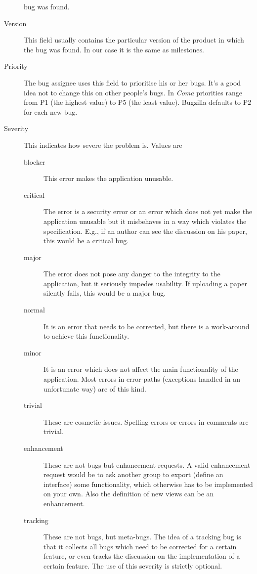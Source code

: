 \documentclass[11pt,nologo,handout]{handout}
\newcommand{\Coma}{\textsl{Coma}}
\begin{document}
\begin{description}
  bug was found.
\item[Version]  This field usually contains the particular version of the
  product in which the bug was found.  In our case it is the same as
  milestones.
\item[Priority]  The bug assignee uses this field to prioritise his or her
  bugs.  It's a good idea not to change this on other people's bugs.  In
  {\Coma} priorities range from P1 (the highest value) to P5 (the least
  value).  Bugzilla defaults to P2 for each new bug.
\item[Severity]  This indicates how severe the problem is.  Values are
  \begin{description}
  \item[blocker]  This error makes the application unusable.
  \item[critical]  The error is a security error or an error which does not
    yet make the application unusable but it misbehaves in a way which
    violates the specification.  E.g., if an author can see the discussion
    on his paper, this would be a critical bug.
  \item[major]  The error does not pose any danger to the integrity to the
    application, but it seriously impedes usability.  If uploading a paper
    silently fails, this would be a major bug.
  \item[normal]  It is an error that needs to be corrected, but there is
    a work-around to achieve this functionality.
  \item[minor]  It is an error which does not affect the main functionality
    of the application.  Most errors in error-paths (exceptions handled in
    an unfortunate way) are of this kind.
  \item[trivial]  These are cosmetic issues.  Spelling errors or errors in
    comments are trivial.
  \item[enhancement]  These are not bugs but enhancement requests.  A valid
    enhancement request would be to ask another group to export (define an
    interface) some functionality, which otherwise has to be implemented on
    your own.  Also the definition of new views can be an enhancement.
  \item[tracking]  These are not bugs, but meta-bugs.  The idea of a
    tracking bug is that it collects all bugs which need to be corrected
    for a certain feature, or even tracks the discussion on the
    implementation of a certain feature.  The use of this severity is
    strictly optional.
  \end{description}

\end{description}
\end{document}
